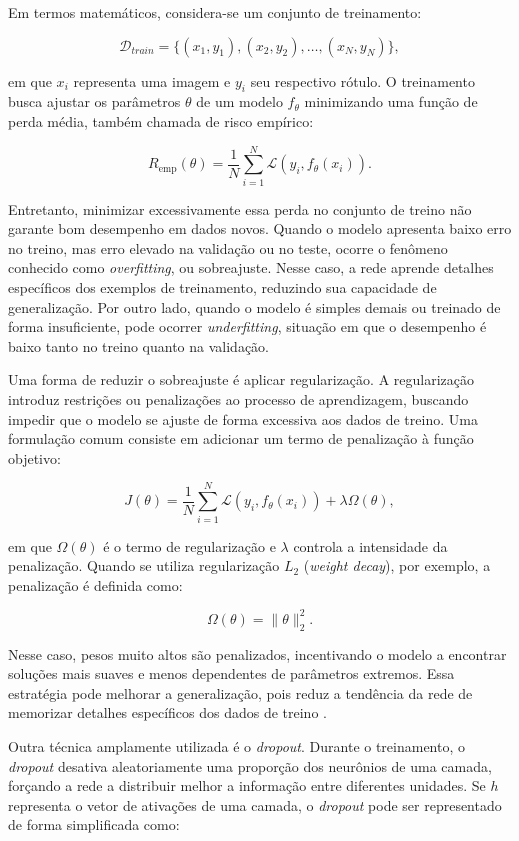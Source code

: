 \documentclass[
    12pt,
    openright,
    oneside,
    a4paper,
    english,
    brazil
]{abntex2}
\begin{document}
Em termos matemáticos, considera-se um conjunto de treinamento:

\[
\mathcal{D}_{train} = \{(x_1,y_1),(x_2,y_2),\ldots,(x_N,y_N)\},
\]

em que \(x_i\) representa uma imagem e \(y_i\) seu respectivo rótulo. O treinamento busca ajustar os parâmetros \(\theta\) de um modelo \(f_{\theta}\) minimizando uma função de perda média, também chamada de risco empírico:

\[
R_{\text{emp}}(\theta) =
\frac{1}{N}
\sum_{i=1}^{N}
\mathcal{L}(y_i, f_{\theta}(x_i)).
\]

Entretanto, minimizar excessivamente essa perda no conjunto de treino não garante bom desempenho em dados novos. Quando o modelo apresenta baixo erro no treino, mas erro elevado na validação ou no teste, ocorre o fenômeno conhecido como \textit{overfitting}, ou sobreajuste. Nesse caso, a rede aprende detalhes específicos dos exemplos de treinamento, reduzindo sua capacidade de generalização. Por outro lado, quando o modelo é simples demais ou treinado de forma insuficiente, pode ocorrer \textit{underfitting}, situação em que o desempenho é baixo tanto no treino quanto na validação.

Uma forma de reduzir o sobreajuste é aplicar regularização. A regularização introduz restrições ou penalizações ao processo de aprendizagem, buscando impedir que o modelo se ajuste de forma excessiva aos dados de treino. Uma formulação comum consiste em adicionar um termo de penalização à função objetivo:

\[
J(\theta) =
\frac{1}{N}
\sum_{i=1}^{N}
\mathcal{L}(y_i, f_{\theta}(x_i))
+
\lambda \Omega(\theta),
\]

em que \(\Omega(\theta)\) é o termo de regularização e \(\lambda\) controla a intensidade da penalização. Quando se utiliza regularização \(L_2\) (\textit{weight decay}), por exemplo, a penalização é definida como:

\[
\Omega(\theta) = \|\theta\|_2^2.
\]

Nesse caso, pesos muito altos são penalizados, incentivando o modelo a encontrar soluções mais suaves e menos dependentes de parâmetros extremos. Essa estratégia pode melhorar a generalização, pois reduz a tendência da rede de memorizar detalhes específicos dos dados de treino \cite{goodfellow2016deep}.

Outra técnica amplamente utilizada é o \textit{dropout}. Durante o treinamento, o \textit{dropout} desativa aleatoriamente uma proporção dos neurônios de uma camada, forçando a rede a distribuir melhor a informação entre diferentes unidades. Se \(h\) representa o vetor de ativações de uma camada, o \textit{dropout} pode ser representado de forma simplificada como:
\end{document}
